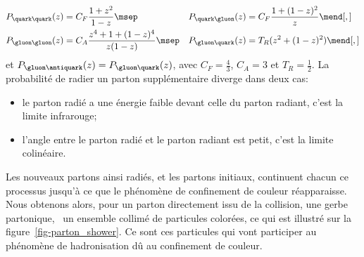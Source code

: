 \begin{align}
P_{\quark\quark}(z) &= C_F \frac{1+z^2}{1-z} \msep&
P_{\quark\gluon}(z) &= C_F \frac{1+(1-z)^2}{z} \mend[,]
\\
P_{\gluon\gluon}(z) &= C_A \frac{z^4 + 1 + (1-z)^4}{z(1-z)} \msep&
P_{\gluon\quark}(z) &= T_R (z^2+(1-z)^2) \mend[,]
\end{align}
et $P_{\gluon\antiquark}(z) = P_{\gluon\quark}(z)$,
avec
$C_F=\frac{4}{3}$,
$C_A = 3$ et
$T_R=\frac{1}{2}$.
La probabilité de radier un parton supplémentaire diverge dans deux cas:
\begin{itemize}
\item le parton radié a une énergie faible devant celle du parton radiant, c'est la limite infrarouge;
\item l'angle entre le parton radié et le parton radiant est petit, c'est la limite colinéaire.
\end{itemize}
\par Les nouveaux partons ainsi radiés, et les partons initiaux, continuent chacun ce processus jusqu'à ce que le phénomène de confinement de couleur réapparaisse. Nous obtenons alors, pour un parton directement issu de la collision, une gerbe partonique, \ie\ un ensemble collimé de particules colorées, ce qui est illustré sur la figure~\ref{fig-parton_shower}.
Ce sont ces particules qui vont participer au phénomène de hadronisation dû au confinement de couleur.
